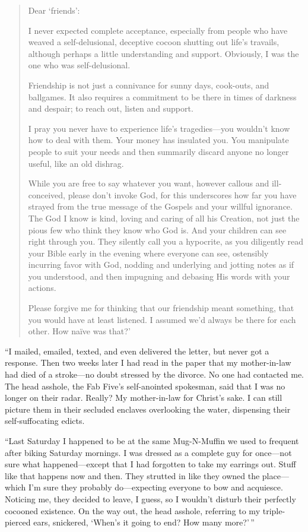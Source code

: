 \begin{quote}
Dear `friends':

I never expected complete acceptance, especially from people who have
weaved a self-delusional, deceptive cocoon shutting out life's travails,
although perhaps a little understanding and support. Obviously, I was
the one who was self-delusional.

Friendship is not just a connivance for sunny days, cook-outs, and
ballgames. It also requires a commitment to be there in times of
darkness and despair; to reach out, listen and support.

I pray you never have to experience life's tragedies---you wouldn't know
how to deal with them. Your money has insulated you. You manipulate
people to suit your needs and then summarily discard anyone no longer
useful, like an old dishrag.

While you are free to say whatever you want, however callous and
ill-conceived, please don't invoke God, for this underscores how far you
have strayed from the true message of the Gospels and your willful
ignorance. The God I know is kind, loving and caring of all his
Creation, not just the pious few who think they know who God is. And
your children can see right through you. They silently call you a
hypocrite, as you diligently read your Bible early in the evening where
everyone can see, ostensibly incurring favor with God, nodding and
underlying and jotting notes as if you understood, and then impugning
and debasing His words with your actions.

Please forgive me for thinking that our friendship meant something, that
you would have at least listened. I assumed we'd always be there for
each other. How naïve was that?'
\end{quote}

\noindent ``I mailed, emailed, texted, and even delivered the letter, but
never got a response. Then two weeks later I had read in the paper that
my mother-in-law had died of a stroke---no doubt stressed by the
divorce. No one had contacted me. The head asshole, the Fab Five's
self-anointed spokesman, said that I was no longer on their radar.
Really? My mother-in-law for Christ's sake. I can still picture them in
their secluded enclaves overlooking the water, dispensing their
self-suffocating edicts.

``Last Saturday I happened to be at the same Mug-N-Muffin we used to
frequent after biking Saturday mornings. I was dressed as a complete guy
for once---not sure what happened---except that I had forgotten to take
my earrings out. Stuff like that happens now and then. They strutted in
like they owned the place---which I'm sure they probably do---expecting
everyone to bow and acquiesce. Noticing me, they decided to leave, I
guess, so I wouldn't disturb their perfectly cocooned existence. On the
way out, the head asshole, referring to my triple-pierced ears,
snickered, `When's it going to end? How many more?'\,''

